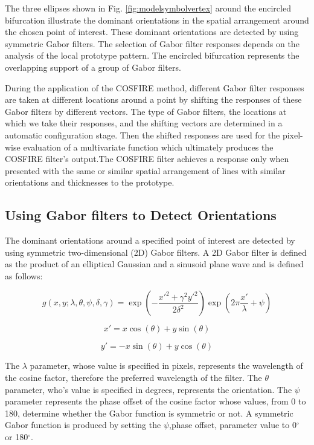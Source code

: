 The three ellipses shown in Fig. \ref{fig:modelsymbolvertex} around the encircled bifurcation illustrate the dominant orientations in the spatial arrangement around the chosen point of interest. These dominant orientations are detected by using symmetric Gabor filters. The selection of Gabor filter responses depends on the analysis of the local prototype pattern. The encircled bifurcation represents the overlapping support of a group of Gabor filters.

During the application of the COSFIRE method, different Gabor filter responses are taken at different locations around a point by shifting the responses of these Gabor filters by different vectors. The type of Gabor filters, the locations at which we take their responses, and the shifting vectors are determined in a automatic configuration stage. Then the shifted responses are used for the pixel-wise evaluation of a multivariate function which ultimately produces the COSFIRE filter's output.The COSFIRE filter achieves a response only when presented with the same or similar spatial arrangement of lines with similar orientations and thicknesses to the prototype.



\subsection{Using Gabor filters to Detect Orientations}
The dominant orientations around a specified point of interest are detected by using symmetric two-dimensional (2D) Gabor filters. A 2D Gabor filter is defined as the product of an elliptical Gaussian and a sinusoid plane wave and is defined as follows:

\begin{equation}
   g(x,y;\lambda,\theta,\psi,\delta,\gamma) = \exp(-\frac{x'^2+\gamma^2y'^2}{2\delta^2}) \exp(2\pi \frac{x'}{\lambda}+\psi)
\end{equation}

\begin{equation}
x' = x \cos(\theta)+y\sin(\theta)
\end{equation}

\begin{equation}
y' = -x \sin(\theta)+y\cos(\theta)
\end{equation}

The $\lambda$ parameter, whose value is specified in pixels, represents the wavelength of the cosine factor, therefore the preferred wavelength of the filter. The $\theta$ parameter, who's value is specified in degrees, represents the orientation. The $\psi$ parameter represents the phase offset of the cosine factor whose values, from 0 to 180, determine whether the Gabor function is symmetric or not. A symmetric Gabor function is produced by setting the $\psi$,phase offset, parameter value to 0$^{\circ}$ or 180$^{\circ}$.\\

